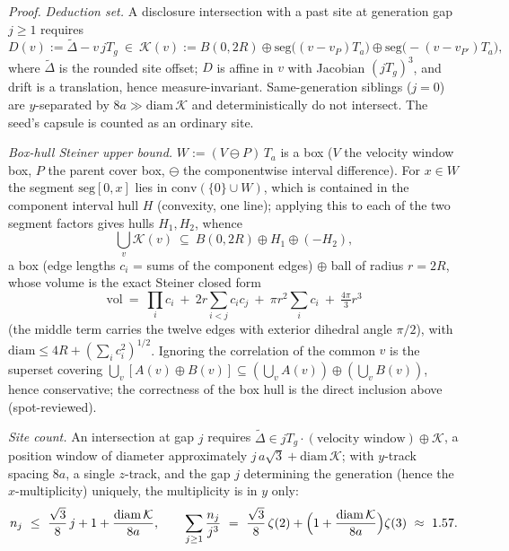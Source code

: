 \documentclass[11pt]{article}
\newcommand{\Ta}{T_a}
\newcommand{\Tg}{T_g}
\begin{document}
\noindent\emph{Proof.}
\emph{Deduction set.} A disclosure intersection with a past site at
generation gap $j\ge1$ requires
\[
  D(v):=\tilde\Delta-v\,j\Tg\ \in\
  \mathcal{K}(v):=B(0,2R)\oplus\mathrm{seg}\bigl((v-v_P)\Ta\bigr)
  \oplus\mathrm{seg}\bigl(-(v-v_{P'})\Ta\bigr),
\]
where $\tilde\Delta$ is the rounded site offset; $D$ is affine in $v$ with
Jacobian $(j\Tg)^3$, and drift is a translation, hence measure-invariant.
Same-generation siblings ($j=0$) are $y$-separated by
$8a\gg\mathrm{diam}\,\mathcal{K}$ and deterministically do not intersect.
The seed's capsule is counted as an ordinary site.

\emph{Box-hull Steiner upper bound.} $W:=(V\ominus P)\,\Ta$ is a box ($V$
the velocity window box, $P$ the parent cover box, $\ominus$ the
componentwise interval difference). For $x\in W$ the segment
$\mathrm{seg}[0,x]$ lies in $\mathrm{conv}(\{0\}\cup W)$, which is
contained in the component interval hull $H$ (convexity, one line);
applying this to each of the two segment factors gives hulls $H_1,H_2$,
whence
\[
  \bigcup_v\mathcal{K}(v)\ \subseteq\ B(0,2R)\oplus H_1\oplus(-H_2),
\]
a box (edge lengths $c_i$ = sums of the component edges) $\oplus$ ball of
radius $r=2R$, whose volume is the exact Steiner closed form
\[
  \mathrm{vol}\ =\ \prod_i c_i\ +\ 2r\sum_{i<j}c_ic_j\ +\
  \pi r^2\sum_i c_i\ +\ \tfrac{4\pi}{3}r^3
\]
(the middle term carries the twelve edges with exterior dihedral angle
$\pi/2$), with $\mathrm{diam}\le4R+(\sum_ic_i^2)^{1/2}$. Ignoring the
correlation of the common $v$ is the superset covering
$\bigcup_v[A(v)\oplus B(v)]\subseteq(\bigcup_vA(v))\oplus(\bigcup_vB(v))$,
hence conservative; the correctness of the box hull is the direct inclusion
above (spot-reviewed).

\emph{Site count.} An intersection at gap $j$ requires
$\tilde\Delta\in j\Tg\cdot(\text{velocity window})\oplus\mathcal{K}$, a
position window of diameter approximately
$j\,a\sqrt3+\mathrm{diam}\,\mathcal{K}$; with $y$-track spacing $8a$, a
single $z$-track, and the gap $j$ determining the generation (hence the
$x$-multiplicity) uniquely, the multiplicity is in $y$ only:
\[
  n_j\ \le\ \frac{\sqrt3}{8}\,j+1+\frac{\mathrm{diam}\,\mathcal{K}}{8a},
  \qquad
  \sum_{j\ge1}\frac{n_j}{j^3}\ =\ \frac{\sqrt3}{8}\,\zeta(2)
  +\Bigl(1+\frac{\mathrm{diam}\,\mathcal{K}}{8a}\Bigr)\zeta(3)\ \approx\
  1.57 .
\]
\end{document}
